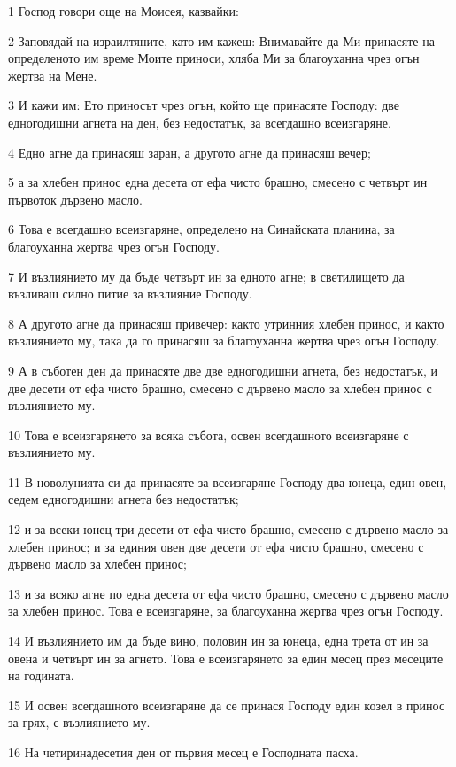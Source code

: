 \par 1 Господ говори още на Моисея, казвайки:
\par 2 Заповядай на израилтяните, като им кажеш: Внимавайте да Ми принасяте на определеното им време Моите приноси, хляба Ми за благоуханна чрез огън жертва на Мене.
\par 3 И кажи им: Ето приносът чрез огън, който ще принасяте Господу: две едногодишни агнета на ден, без недостатък, за всегдашно всеизгаряне.
\par 4 Едно агне да принасяш заран, а другото агне да принасяш вечер;
\par 5 а за хлебен принос една десета от ефа чисто брашно, смесено с четвърт ин първоток дървено масло.
\par 6 Това е всегдашно всеизгаряне, определено на Синайската планина, за благоуханна жертва чрез огън Господу.
\par 7 И възлиянието му да бъде четвърт ин за едното агне; в светилището да възливаш силно питие за възлияние Господу.
\par 8 А другото агне да принасяш привечер: както утринния хлебен принос, и както възлиянието му, така да го принасяш за благоуханна жертва чрез огън Господу.
\par 9 А в съботен ден да принасяте две две едногодишни агнета, без недостатък, и две десети от ефа чисто брашно, смесено с дървено масло за хлебен принос с възлиянието му.
\par 10 Това е всеизгарянето за всяка събота, освен всегдашното всеизгаряне с възлиянието му.
\par 11 В новолунията си да принасяте за всеизгаряне Господу два юнеца, един овен, седем едногодишни агнета без недостатък;
\par 12 и за всеки юнец три десети от ефа чисто брашно, смесено с дървено масло за хлебен принос; и за единия овен две десети от ефа чисто брашно, смесено с дървено масло за хлебен принос;
\par 13 и за всяко агне по една десета от ефа чисто брашно, смесено с дървено масло за хлебен принос. Това е всеизгаряне, за благоуханна жертва чрез огън Господу.
\par 14 И възлиянието им да бъде вино, половин ин за юнеца, една трета от ин за овена и четвърт ин за агнето. Това е всеизгарянето за един месец през месеците на годината.
\par 15 И освен всегдашното всеизгаряне да се принася Господу един козел в принос за грях, с възлиянието му.
\par 16 На четиринадесетия ден от първия месец е Господната пасха.
